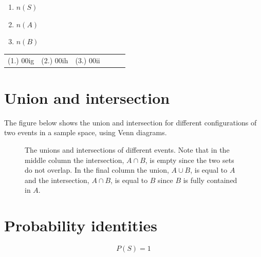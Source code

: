 \begin{exercises}{}
{\begin{enumerate}[itemsep=5pt, label=\textbf{\arabic*}. ]
\begin{enumerate}[noitemsep, label=\textbf{(\alph*)} ]
\begin{enumerate}[noitemsep, label=\textbf{\roman*.} ]
        \item $n\left(S\right)$
        \item $n\left(A\right)$
        \item $n\left(B\right)$
        \end{enumerate}
      \end{enumerate}
    \end{enumerate}
\practiceinfo

\begin{tabular}{cccccc}
    (1.) 00ig& (2.) 00ih& (3.) 00ii\\
  \end{tabular}
}
\end{exercises}

\section{Union and intersection}


The figure below shows the union and intersection for different
configurations of two events in a sample space, using Venn diagrams.

\begin{figure}[H]
  
  \begin{caption*}{The unions and intersections of different events. Note that
    in the middle column the intersection, $A \cap B$, is empty since
    the two sets do not overlap. In the final column the union,
    $A \cup B$, is equal to $A$ and the intersection, $A \cap B$, is
    equal to $B$ since $B$ is fully contained in $A$.}\end{caption*}
  \label{fig:venn_union_intersection}
\end{figure}
\par
{}
\section{Probability identities}
\begin{equation*}
 P(S)=1
\end{equation*}


